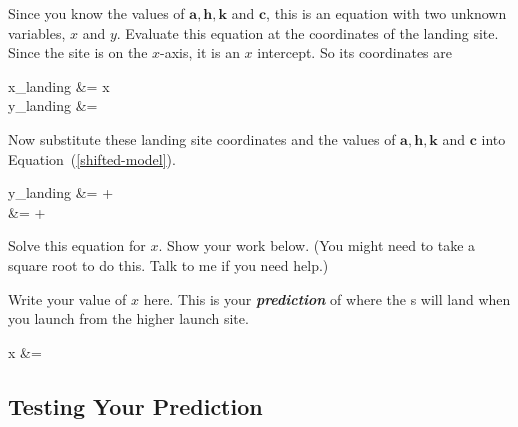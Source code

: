 Since you know the values of $\bm{a}, \bm{h}, \bm{k}$ and $\bm{c}$,
this is an equation with two unknown variables, 
$x$ and $y$.
Evaluate this equation at the coordinates of the landing site.
Since the site is on the $x$-axis, 
it is an $x$ intercept. 
So its coordinates are 
\begin{tcolorbox}[colback=\myFillinColor,ams align]
    x_{landing} &= x \\
    y_{landing} &= 
\end{tcolorbox}

Now substitute these landing site coordinates 
and the values of $\bm{a}, \bm{h}, \bm{k}$ and $\bm{c}$
into Equation~(\ref{shifted-model}).

\begin{tcolorbox}[colback=\myFillinColor,ams align]
    y_{landing} &=  +  \\
     &= 
        + 
\end{tcolorbox}

Solve this equation for $x$.
Show your work below.
(You might need to take a square root to do this. Talk to me if you need help.)
\begin{tcolorbox}[colback=\myFillinColor]
    \vspace{1.25in}
\end{tcolorbox}
\begin{tcolorbox}[colback=\myFillinColor]
    \vspace{2in}
\end{tcolorbox}

Write your value of $x$ here. 
This is your {\bfseries\itshape prediction} of where the \mymm{}s will land 
when you launch from the higher launch site.

\begin{tcolorbox}[colback=\myFillinColor,ams align]
    x &=  \label{x-predicted}
\end{tcolorbox}





\subsection{Testing Your Prediction}

